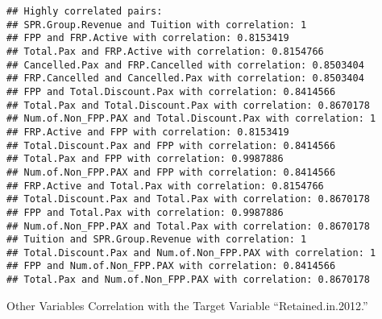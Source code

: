 \documentclass[
]{article}
\newenvironment{Shaded}{\begin{snugshade}}{\end{snugshade}}
\newcommand{\AttributeTok}[1]{\textcolor[rgb]{0.13,0.29,0.53}{#1}}
\newcommand{\CommentTok}[1]{\textcolor[rgb]{0.56,0.35,0.01}{\textit{#1}}}
\newcommand{\ConstantTok}[1]{\textcolor[rgb]{0.56,0.35,0.01}{#1}}
\newcommand{\ControlFlowTok}[1]{\textcolor[rgb]{0.13,0.29,0.53}{\textbf{#1}}}
\newcommand{\FloatTok}[1]{\textcolor[rgb]{0.00,0.00,0.81}{#1}}
\newcommand{\FunctionTok}[1]{\textcolor[rgb]{0.13,0.29,0.53}{\textbf{#1}}}
\newcommand{\NormalTok}[1]{#1}
\newcommand{\OtherTok}[1]{\textcolor[rgb]{0.56,0.35,0.01}{#1}}
\newcommand{\SpecialCharTok}[1]{\textcolor[rgb]{0.81,0.36,0.00}{\textbf{#1}}}
\newcommand{\StringTok}[1]{\textcolor[rgb]{0.31,0.60,0.02}{#1}}
\begin{document}
\begin{verbatim}
## Highly correlated pairs:
## SPR.Group.Revenue and Tuition with correlation: 1 
## FPP and FRP.Active with correlation: 0.8153419 
## Total.Pax and FRP.Active with correlation: 0.8154766 
## Cancelled.Pax and FRP.Cancelled with correlation: 0.8503404 
## FRP.Cancelled and Cancelled.Pax with correlation: 0.8503404 
## FPP and Total.Discount.Pax with correlation: 0.8414566 
## Total.Pax and Total.Discount.Pax with correlation: 0.8670178 
## Num.of.Non_FPP.PAX and Total.Discount.Pax with correlation: 1 
## FRP.Active and FPP with correlation: 0.8153419 
## Total.Discount.Pax and FPP with correlation: 0.8414566 
## Total.Pax and FPP with correlation: 0.9987886 
## Num.of.Non_FPP.PAX and FPP with correlation: 0.8414566 
## FRP.Active and Total.Pax with correlation: 0.8154766 
## Total.Discount.Pax and Total.Pax with correlation: 0.8670178 
## FPP and Total.Pax with correlation: 0.9987886 
## Num.of.Non_FPP.PAX and Total.Pax with correlation: 0.8670178 
## Tuition and SPR.Group.Revenue with correlation: 1 
## Total.Discount.Pax and Num.of.Non_FPP.PAX with correlation: 1 
## FPP and Num.of.Non_FPP.PAX with correlation: 0.8414566 
## Total.Pax and Num.of.Non_FPP.PAX with correlation: 0.8670178
\end{verbatim}

Other Variables Correlation with the Target Variable
``Retained.in.2012.''

\begin{Shaded}
\end{Shaded}
\end{document}
